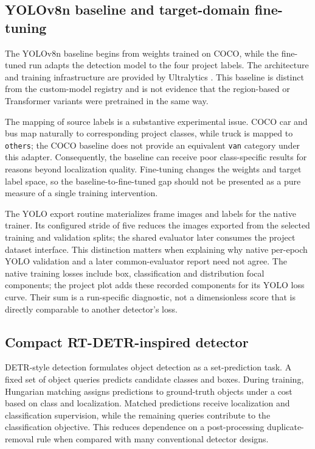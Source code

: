 \subsection{YOLOv8n baseline and target-domain fine-tuning}
The YOLOv8n baseline begins from weights trained on COCO, while the fine-tuned run adapts the detection model to the four project labels. The architecture and training infrastructure are provided by Ultralytics \cite{yolo}. This baseline is distinct from the custom-model registry and is not evidence that the region-based or Transformer variants were pretrained in the same way.

The mapping of source labels is a substantive experimental issue. COCO car and bus map naturally to corresponding project classes, while truck is mapped to \texttt{others}; the COCO baseline does not provide an equivalent \texttt{van} category under this adapter. Consequently, the baseline can receive poor class-specific results for reasons beyond localization quality. Fine-tuning changes the weights and target label space, so the baseline-to-fine-tuned gap should not be presented as a pure measure of a single training intervention.

The YOLO export routine materializes frame images and labels for the native trainer. Its configured stride of five reduces the images exported from the selected training and validation splits; the shared evaluator later consumes the project dataset interface. This distinction matters when explaining why native per-epoch YOLO validation and a later common-evaluator report need not agree. The native training losses include box, classification and distribution focal components; the project plot adds these recorded components for its YOLO loss curve. Their sum is a run-specific diagnostic, not a dimensionless score that is directly comparable to another detector's loss.

\subsection{Compact RT-DETR-inspired detector}
DETR-style detection formulates object detection as a set-prediction task. A fixed set of object queries predicts candidate classes and boxes. During training, Hungarian matching assigns predictions to ground-truth objects under a cost based on class and localization. Matched predictions receive localization and classification supervision, while the remaining queries contribute to the classification objective. This reduces dependence on a post-processing duplicate-removal rule when compared with many conventional detector designs.

